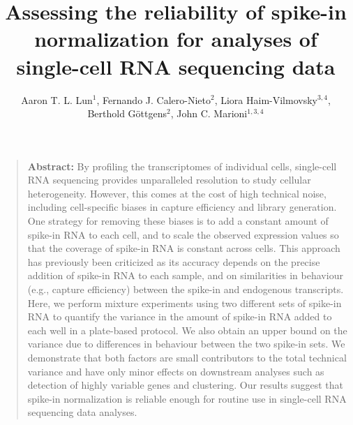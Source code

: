 \documentclass{article}
\title{Assessing the reliability of spike-in normalization for analyses of single-cell RNA sequencing data}
\author{Aaron T. L. Lun$^1$, Fernando J. Calero-Nieto$^2$, Liora Haim-Vilmovsky$^{3,4}$, \\ Berthold G\"ottgens$^2$, John C. Marioni$^{1,3,4}$}
\date{
    \begin{minipage}{0.9\textwidth}
        \begin{flushleft} 
            \begin{small}
                $^1$Cancer Research UK Cambridge Institute, University of Cambridge, Li Ka Shing Centre, Robinson Way, Cambridge CB2 0RE, United Kingdom \\
                $^2$Wellcome Trust and MRC Cambridge Stem Cell Institute,  University of Cambridge, Wellcome Trust/MRC Building, Hills Road, Cambridge CB2 0XY, United Kingdom \\
                $^3$EMBL European Bioinformatics Institute, Wellcome Genome Campus, Hinxton, Cambridge CB10 1SD, United Kingdom \\
                $^4$Wellcome Trust Sanger Institute, Wellcome Genome Campus, Hinxton, Cambridge CB10 1SA, United Kingdom \\
            \end{small}
        \end{flushleft}
    \end{minipage}\\[0.2in]
    \today{}
}
\begin{document}
\maketitle

\begin{quote}
\textbf{Abstract:}
By profiling the transcriptomes of individual cells, single-cell RNA sequencing provides unparalleled resolution to study cellular heterogeneity.
However, this comes at the cost of high technical noise, including cell-specific biases in capture efficiency and library generation.
One strategy for removing these biases is to add a constant amount of spike-in RNA to each cell, and to scale the observed expression values so that the coverage of spike-in RNA is constant across cells.
This approach has previously been criticized as its accuracy depends on the precise addition of spike-in RNA to each sample, and on similarities in behaviour (e.g., capture efficiency) between the spike-in and endogenous transcripts.
Here, we perform mixture experiments using two different sets of spike-in RNA to quantify the variance in the amount of spike-in RNA added to each well in a plate-based protocol.
We also obtain an upper bound on the variance due to differences in behaviour between the two spike-in sets.
We demonstrate that both factors are small contributors to the total technical variance and have only minor effects on downstream analyses such as detection of highly variable genes and clustering.
Our results suggest that spike-in normalization is reliable enough for routine use in single-cell RNA sequencing data analyses.
\end{quote}
\end{document}
